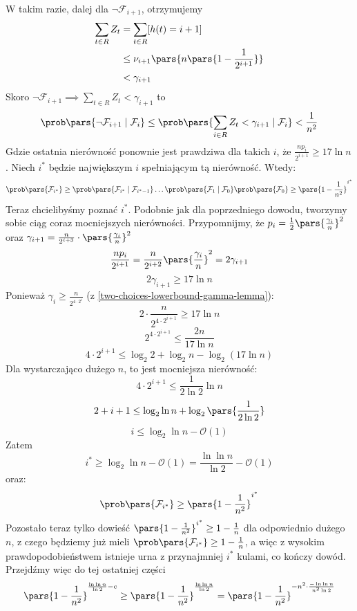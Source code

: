 W takim razie, dalej dla \( \neg\mathcal{F}_{i+1} \), otrzymujemy
\begin{align*}
	\sum_{t \in R} Z_t & = \sum_{t \in R}[h(t) = i + 1]                     \\
	                   & \leq \nu_{i+1}\pars{n\pars{1 - \frac{1}{2^{i+1}}}} \\
	                   & < \gamma_{i+1}
\end{align*}
Skoro \( \neg\mathcal{F}_{i+1} \implies \sum_{t \in R} Z_t < \gamma_{i+1}\) to
\[
	\prob\pars{\neg\mathcal{F}_{i+1} \mid \mathcal{F}_i} \leq \prob\pars{\sum_{i \in R} Z_t < \gamma_{i+1} \mid \mathcal{F}_i} < \frac{1}{n^2}
\]
Gdzie ostatnia nierówność ponownie jest prawdziwa dla takich \( i \), że \( \frac{np_i}{2^{i+1}} \geq 17\ln n\). Niech \( i^* \) będzie największym \( i \) spełniającym tą nierówność. Wtedy:
\[
	\prob\pars{\mathcal{F}_{i^*}} \geq \prob\pars{\mathcal{F}_{i^*} \mid \mathcal{F}_{i^* - 1}} \ldots \prob\pars{\mathcal{F}_1 \mid \mathcal{F}_0}\prob\pars{\mathcal{F}_0} \geq \pars{1 - \frac{1}{n^2}}^{i^*}
\]
Teraz chcielibyśmy poznać \( i^* \). Podobnie jak dla poprzedniego dowodu, tworzymy sobie ciąg coraz mocniejszych nierówności. Przypomnijmy, że \( p_i = \frac{1}{2}\pars{\frac{\gamma_i}{n}}^2 \) oraz \(\gamma_{i+1} = \frac{n}{2^{i+3}} \cdot \pars{\frac{\gamma_i}{n}}^2\)
\[
	\frac{np_i}{2^{i+1}} = \frac{n}{2^{i+2}} \pars{\frac{\gamma_i}{n}}^2 = 2\gamma_{i+1}
\]
\[
	2\gamma_{i+1} \geq 17\ln n
\]
Ponieważ \( \gamma_i \geq \frac{n}{2^{4\cdot 2 ^i}} \) (z \ref{two-choices-lowerbound-gamma-lemma}):
\[
	2 \cdot \frac{n}{2^{4 \cdot 2^{i+1}}} \geq 17\ln n
\]
\[
	2^{4 \cdot 2 ^{i+1}}  \leq \frac{2n}{17\ln n}
\]
\[
	4 \cdot 2^{i+1} \leq \log_2 2 + \log_2 n - \log_2(17 \ln n)
\]
Dla wystarczająco dużego \(n\), to jest mocniejsza nierówność:
\[
	4 \cdot 2^{i+1} \leq \frac{1}{2\ln 2} \ln n
\]
\[
	2 + i + 1 \leq \log_2 \ln n + \log_2\pars{\frac{1}{2 \ln 2}}
\]
\[
	i \leq \log_2 \ln n - \mathcal{O}(1)
\]
Zatem
\[
	i^* \geq \log_2 \ln n - \mathcal{O}(1) = \frac{\ln \ln n}{\ln 2} - \mathcal{O}(1)
\]
oraz:
\[
	\prob\pars{\mathcal{F}_{i^*}} \geq \pars{1 - \frac{1}{n^2}}^{i^*}
\]
Pozostało teraz tylko dowieść \(\pars{1 - \frac{1}{n^2}}^{i^*} \geq 1 - \frac{1}{n}\) dla odpowiednio dużego \(n\), z czego będziemy już mieli \(\prob\pars{\mathcal{F}_{i^*}} \geq 1 - \frac{1}{n}\), a więc z wysokim prawdopodobieństwem istnieje urna z przynajmniej \(i^*\) kulami, co kończy dowód. Przejdźmy więc do tej ostatniej części
\[
	\pars{1 - \frac{1}{n^2}}^{\frac{\ln \ln n}{\ln 2} - c} \geq \pars{1 - \frac{1}{n^2}}^{\frac{\ln \ln n}{\ln 2}} = \pars{1 - \frac{1}{n^2}}^{-n^2 \cdot \frac{-\ln \ln n}{n^2 \ln 2}}
\]
